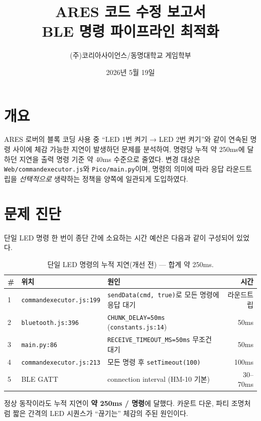 \documentclass[11pt, oneside]{article}
\title{%
  {\sffamily\bfseries\fontsize{20}{24}\selectfont\color{deepblue}ARES 코드 수정 보고서}\\[4pt]
  {\rmfamily\normalsize\color{accentcopper}BLE 명령 파이프라인 최적화}
}
\author{\sffamily (주)코리아사이언스\quad/\quad 동명대학교 게임학부}
\date{2026년 5월 19일}
\begin{document}
\maketitle
\thispagestyle{plain}

\section{개요}

ARES 로버의 블록 코딩 사용 중 ``LED 1번 켜기 → LED 2번 켜기''와 같이
연속된 명령 사이에 체감 가능한 지연이 발생하던 문제를 분석하여, 명령당
누적 약 250ms에 달하던 지연을 출력 명령 기준 약 40ms 수준으로 줄였다.
변경 대상은 \texttt{Web/commandexecutor.js}와 \texttt{Pico/main.py}이며,
명령의 의미에 따라 응답 라운드트립을 \emph{선택적으로} 생략하는 정책을
양쪽에 일관되게 도입하였다.

\section{문제 진단}

단일 LED 명령 한 번이 종단 간에 소요하는 시간 예산은 다음과 같이
구성되어 있었다.

\begin{table}[h]
\centering
\small
\begin{tabularx}{\linewidth}{@{}llXr@{}}
\toprule
\# & 위치 & 원인 & 시간 \\
\midrule
1 & \texttt{commandexecutor.js:199} & \texttt{sendData(cmd, true)}로 모든 명령에 응답 대기 & 라운드트립 \\
2 & \texttt{bluetooth.js:396} & \texttt{CHUNK\_DELAY=50ms} (\texttt{constants.js:14}) & 50ms \\
3 & \texttt{main.py:86} & \texttt{RECEIVE\_TIMEOUT\_MS=50ms} 무조건 대기 & 50ms \\
4 & \texttt{commandexecutor.js:213} & 모든 명령 후 \texttt{setTimeout(100)} & 100ms \\
5 & BLE GATT  & connection interval (HM-10 기본) & 30--70ms \\
\bottomrule
\end{tabularx}
\caption{단일 LED 명령의 누적 지연(개선 전) — 합계 약 250ms.}
\end{table}

\begin{keypoint}
정상 동작이라도 누적 지연이 \textbf{약 250ms / 명령}에 달했다. 카운트
다운, 파티 조명처럼 짧은 간격의 LED 시퀀스가 ``끊기는'' 체감의 주된
원인이다.
\end{keypoint}
\end{document}
